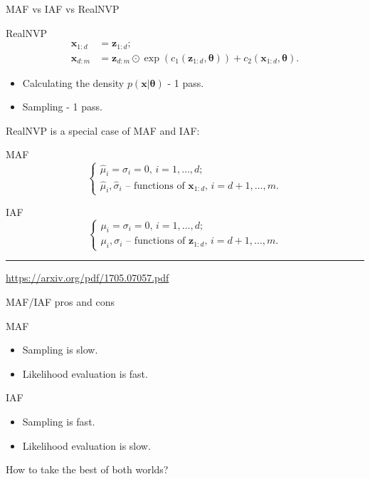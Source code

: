 \documentclass{beamer}
\newcommand{\bx}{\mathbf{x}}
\newcommand{\bz}{\mathbf{z}}
\newcommand{\btheta}{\boldsymbol{\theta}}
\begin{document}
\begin{frame}{MAF vs IAF vs RealNVP}
	\begin{block}{RealNVP}
		\vspace{-0.7cm}
		\begin{align*}
			\bx_{1:d} &= \bz_{1:d}; \\ \bx_{d:m} &= \bz_{d:m} \odot \exp \left(c_1(\bz_{1:d}, \btheta)\right) + c_2(\bx_{1:d}, \btheta).
		\end{align*}
		\vspace{-0.8cm}
	\end{block}
	\begin{itemize}
		\item Calculating the density $p(\bx | \btheta)$ - 1 pass.
		\item Sampling - 1 pass.
	\end{itemize}
	
	RealNVP is a special case of MAF and IAF:
	\begin{block}{MAF}
		\vspace{-0.5cm}
		\begin{equation*}
			\begin{cases}
				\hat{\mu}_i  = \hat{\sigma}_i = 0, \, i = 1, \dots, d; \\
				\hat{\mu}_i, \hat{\sigma}_i \text{ -- functions of } \bx_{1:d}, \, i = d+1, \dots, m.
			\end{cases}
		\end{equation*}
		\vspace{-0.3cm}
	\end{block}
	\begin{block}{IAF}
		\vspace{-0.3cm}
		\begin{equation*}
			\begin{cases}
				\mu_i  = \sigma_i = 0, \, i = 1, \dots, d; \\
				\mu_i, \sigma_i \text{ -- functions of } \bz_{1:d}, \, i = d+1, \dots, m.
			\end{cases}
		\end{equation*}
	\end{block}
	\vfill
	\hrule\medskip
	{\scriptsize \href{https://arxiv.org/pdf/1705.07057.pdf}{https://arxiv.org/pdf/1705.07057.pdf}} 
\end{frame}
\begin{frame}{MAF/IAF pros and cons}
	\begin{block}{MAF}
		\begin{itemize}
			\item Sampling is slow.
			\item Likelihood evaluation is fast.
		\end{itemize}
	\end{block}
	\begin{block}{IAF}
		\begin{itemize}
			\item Sampling is fast.
			\item Likelihood evaluation is slow.
		\end{itemize}
	\end{block}
	\vspace{0.3cm}
	How to take the best of both worlds?
\end{frame}
\end{document}
